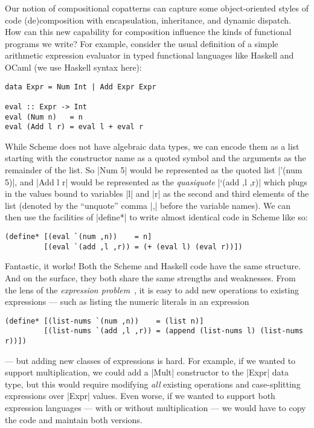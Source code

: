 Our notion of compositional copatterns can capture some object-oriented styles of code (de)composition with encapsulation, inheritance, and dynamic dispatch.
How can this new capability for composition influence the kinds of functional programs we write?
For example, consider the usual definition of a simple arithmetic expression evaluator in typed functional languages like Haskell and OCaml (we use Haskell syntax here):
\begin{verbatim}
data Expr = Num Int | Add Expr Expr

eval :: Expr -> Int
eval (Num n)   = n
eval (Add l r) = eval l + eval r
\end{verbatim}
While Scheme does not have algebraic data types, we can encode them as a list starting with the constructor name as a quoted symbol and the arguments as the remainder of the list.
So \hs|Num 5| would be represented as the quoted list \scm|'(num 5)|, and \scm|Add l r| would be represented as the \emph{quasiquote} \scm|`(add ,l ,r)| which plugs in the values bound to variables \scm|l| and \scm|r| as the second and third elements of the list (denoted by the ``unquote'' comma \scm|,| before the variable names).
We can then use the facilities of \scm|define*| to write almost identical code in Scheme like so:
\begin{verbatim}
(define* [(eval `(num ,n))    = n]
         [(eval `(add ,l ,r)) = (+ (eval l) (eval r))])
\end{verbatim}
Fantastic, it works!
Both the Scheme and Haskell code have the same structure.
And on the surface, they both share the same strengths and weaknesses.
From the lens of the \emph{expression problem}~\cite{ExpressionProblem}, it is easy to add new operations to existing expressions --- such as listing the numeric literals in an expression
\begin{verbatim}
(define* [(list-nums `(num ,n))    = (list n)]
         [(list-nums `(add ,l ,r)) = (append (list-nums l) (list-nums r))])
\end{verbatim}
--- but adding new classes of expressions is hard.
For example, if we wanted to support multiplication, we could add a \hs|Mult| constructor to the \hs|Expr| data type, but this would require modifying \emph{all} existing operations and case-splitting expressions over \hs|Expr| values.
Even worse, if we wanted to support both expression languages --- with or without multiplication --- we would have to copy the code and maintain both versions.

